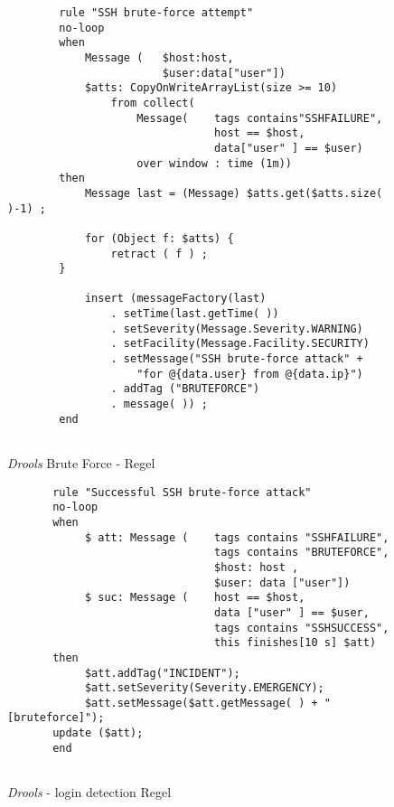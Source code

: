 \begin{figure}[h]
    \caption{\textit{Drools} Brute Force - Regel}
    \label{app:drools-warning}\vspace{0.2cm}
    \centering
    \begin{minipage}{0.8\textwidth}
\begin{verbatim}
        rule "SSH brute-force attempt"
        no-loop
        when
            Message (   $host:host,
                        $user:data["user"])
            $atts: CopyOnWriteArrayList(size >= 10)
                from collect(
                    Message(    tags contains"SSHFAILURE",
                                host == $host,
                                data["user" ] == $user)
                    over window : time (1m))
        then
            Message last = (Message) $atts.get($atts.size( )-1) ;
        
            for (Object f: $atts) {
                retract ( f ) ;
        }
        
            insert (messageFactory(last)
                . setTime(last.getTime( ))
                . setSeverity(Message.Severity.WARNING)
                . setFacility(Message.Facility.SECURITY)
                . setMessage("SSH brute-force attack" +
                    "for @{data.user} from @{data.ip}")
                . addTag ("BRUTEFORCE")
                . message( )) ;
        end        
        
\end{verbatim}
\end{minipage}
\end{figure}

\begin{figure}[h]
    \caption{\textit{Drools} - login detection Regel}
    \label{app:drools-emergency}\vspace{0.2cm}
    \centering
    \begin{minipage}{0.8\textwidth}
\begin{verbatim}
       rule "Successful SSH brute-force attack"
       no-loop
       when
            $ att: Message (    tags contains "SSHFAILURE",
                                tags contains "BRUTEFORCE",
                                $host: host ,
                                $user: data ["user"])
            $ suc: Message (    host == $host,
                                data ["user" ] == $user,
                                tags contains "SSHSUCCESS",
                                this finishes[10 s] $att)
       then
            $att.addTag("INCIDENT");
            $att.setSeverity(Severity.EMERGENCY);
            $att.setMessage($att.getMessage( ) + "[bruteforce]");
       update ($att);
       end
        
\end{verbatim}
\end{minipage}
\end{figure}